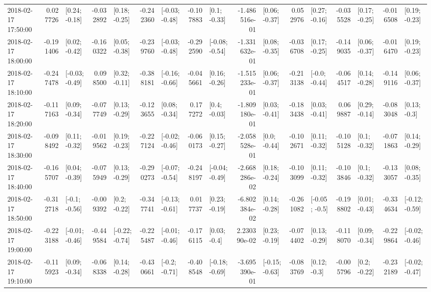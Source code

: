 \begin{tabular}{lrlrlrlrlrlrlrlrl}
2018-02-17 17:50:00 &  0.027726 &   [0.24; -0.18] & -0.032892 &   [0.18; -0.25] & -0.242360 &  [-0.03; -0.48] & -0.107883 &    [0.1; -0.33] & -1.486516e-01 &   [0.06; -0.37] &  0.052976 &   [0.27; -0.16] & -0.035528 &   [0.17; -0.25] & -0.016508 &   [0.19; -0.23] \\
2018-02-17 18:00:00 & -0.191406 &   [0.02; -0.42] & -0.160322 &   [0.05; -0.38] & -0.239760 &  [-0.03; -0.48] & -0.292590 &  [-0.08; -0.54] & -1.331632e-01 &   [0.08; -0.35] & -0.036708 &   [0.17; -0.25] & -0.149035 &   [0.06; -0.37] & -0.016470 &   [0.19; -0.23] \\
2018-02-17 18:10:00 & -0.247478 &  [-0.03; -0.49] &  0.098500 &   [0.32; -0.11] & -0.388181 &  [-0.16; -0.66] & -0.045661 &   [0.16; -0.26] & -1.515233e-01 &   [0.06; -0.37] & -0.213138 &   [-0.0; -0.44] & -0.064517 &   [0.14; -0.28] & -0.149116 &   [0.06; -0.37] \\
2018-02-17 18:20:00 & -0.117163 &   [0.09; -0.34] & -0.077749 &   [0.13; -0.29] & -0.123655 &   [0.08; -0.34] &  0.177272 &    [0.4; -0.03] & -1.809180e-01 &   [0.03; -0.41] & -0.183438 &   [0.03; -0.41] &  0.069887 &   [0.29; -0.14] & -0.083048 &    [0.13; -0.3] \\
2018-02-17 18:30:00 & -0.098492 &   [0.11; -0.32] & -0.019562 &   [0.19; -0.23] & -0.227124 &  [-0.02; -0.46] & -0.060173 &   [0.15; -0.27] & -2.058528e-01 &    [0.0; -0.44] & -0.102671 &   [0.11; -0.32] & -0.105128 &    [0.1; -0.32] & -0.071863 &   [0.14; -0.29] \\
2018-02-17 18:40:00 & -0.165707 &   [0.04; -0.39] & -0.075949 &   [0.13; -0.29] & -0.290273 &  [-0.07; -0.54] & -0.248197 &  [-0.04; -0.49] & -2.668286e-02 &   [0.18; -0.24] & -0.103099 &   [0.11; -0.32] & -0.103846 &    [0.1; -0.32] & -0.133057 &   [0.08; -0.35] \\
2018-02-17 18:50:00 & -0.312718 &   [-0.1; -0.56] & -0.009392 &    [0.2; -0.22] & -0.347741 &  [-0.13; -0.61] &  0.017737 &   [0.23; -0.19] & -6.802384e-02 &   [0.14; -0.28] & -0.261082 &   [-0.05; -0.5] & -0.198802 &   [0.01; -0.43] & -0.334634 &  [-0.12; -0.59] \\
2018-02-17 19:00:00 & -0.223188 &  [-0.01; -0.46] & -0.449584 &  [-0.22; -0.74] & -0.225487 &  [-0.01; -0.46] & -0.176115 &    [0.03; -0.4] &  2.230390e-02 &   [0.23; -0.19] & -0.074402 &   [0.13; -0.29] & -0.118070 &   [0.09; -0.34] & -0.229864 &  [-0.02; -0.46] \\
2018-02-17 19:10:00 & -0.115923 &   [0.09; -0.34] & -0.068338 &   [0.14; -0.28] & -0.430661 &   [-0.2; -0.71] & -0.408548 &  [-0.18; -0.69] & -3.695390e-01 &  [-0.15; -0.63] & -0.083769 &    [0.12; -0.3] & -0.005796 &    [0.2; -0.22] & -0.232189 &  [-0.02; -0.47] \\

\end{tabular}
